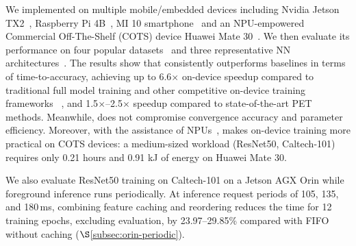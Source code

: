 We implemented \sys on multiple mobile/embedded devices including Nvidia Jetson TX2~\cite{tx2}, Raspberry Pi 4B~\cite{rpi}, MI 10 smartphone~\cite{mi10} and an NPU-empowered Commercial Off-The-Shelf (COTS) device Huawei Mate 30~\cite{HuaWei}.
We then evaluate its performance on four popular datasets~\cite{c101, c256, Dvg, dtd} and three representative NN architectures~\cite{he2015deep, howard2019searching, dosovitskiy2021an}.
The results show that \sys consistently outperforms baselines in terms of time-to-accuracy, achieving up to 6.6$\times$ on-device speedup compared to traditional full model training and other competitive on-device training frameworks ~\cite{huang2023elastictrainer, 10.1145/3295500.3356156}, and 1.5$\times$--2.5$\times$ speedup compared to state-of-the-art PET methods.
Meanwhile, \sys does not compromise convergence accuracy and parameter efficiency.
Moreover, with the assistance of NPUs~\cite{Hiai}, \sys makes on-device training more practical on COTS devices: a medium-sized workload (ResNet50, Caltech-101) requires only 0.21 hours and 0.91 kJ of energy on Huawei Mate 30.

\begingroup
\color{blue}
We also evaluate ResNet50 training on Caltech-101 on a Jetson AGX Orin while foreground inference runs periodically.
At inference request periods of 105, 135, and 180\,ms, combining feature caching and reordering reduces the time for 12 training epochs, excluding evaluation, by 23.97--29.85\% compared with FIFO without caching ($\S$\ref{subsec:orin-periodic}).
\par
\endgroup

